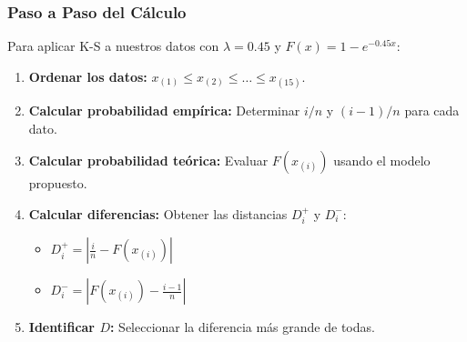 \documentclass[aspectratio=1610, 10pt]{beamer}
\begin{document}
\begin{frame}
\frametitle{Paso a Paso del Cálculo}
Para aplicar K-S a nuestros datos con $\lambda = 0.45$ y $F(x) = 1 - e^{-0.45x}$:

\vspace{0.3cm}
\begin{enumerate}
    \item \textbf{Ordenar los datos:} $x_{(1)} \leq x_{(2)} \leq \dots \leq x_{(15)}$.
    \item \textbf{Calcular probabilidad empírica:} Determinar $i/n$ y $(i-1)/n$ para cada dato.
    \item \textbf{Calcular probabilidad teórica:} Evaluar $F(x_{(i)})$ usando el modelo propuesto.
    \item \textbf{Calcular diferencias:} Obtener las distancias $D_i^+$ y $D_i^-$:
    \begin{itemize}
        \item $D_i^+ = |\frac{i}{n} - F(x_{(i)})|$
        \item $D_i^- = |F(x_{(i)}) - \frac{i-1}{n}|$
    \end{itemize}
    \item \textbf{Identificar $D$:} Seleccionar la diferencia más grande de todas.
\end{enumerate}
\end{frame}
\end{document}
